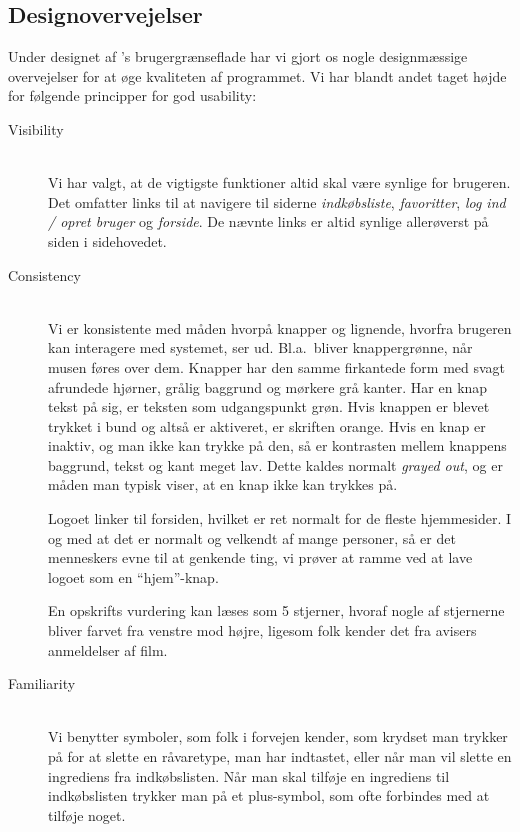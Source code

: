 \subsection{Designovervejelser}
\label{subsec:designovervejelser}

Under designet af \Foodl{}'s brugergrænseflade har vi gjort os nogle designmæssige overvejelser for at øge kvaliteten af programmet. Vi har blandt andet taget højde for følgende principper for god usability\cite[s.~90]{deb}:

\begin{description}
\item[Visibility] \hfill \\
Vi har valgt, at de vigtigste funktioner altid skal være synlige for brugeren. Det omfatter links til at navigere til siderne \textit{indkøbsliste}, \textit{favoritter}, \textit{log ind / opret bruger} og \textit{forside}. De nævnte links er altid synlige allerøverst på siden i sidehovedet.
 
\item[Consistency] \hfill \\
Vi er konsistente med måden hvorpå knapper og lignende, hvorfra brugeren kan interagere med systemet, ser ud. Bl.a.\ bliver knappergrønne, når musen føres over dem. Knapper har den samme firkantede form med svagt afrundede hjørner, grålig baggrund og mørkere grå kanter. Har en knap tekst på sig, er teksten som udgangspunkt grøn. Hvis knappen er blevet trykket i bund og altså er aktiveret, er skriften orange. Hvis en knap er inaktiv, og man ikke kan trykke på den, så er kontrasten mellem knappens baggrund, tekst og kant meget lav. Dette kaldes normalt \textit{grayed out}, og er måden man typisk viser, at en knap ikke kan trykkes på.

Logoet linker til forsiden, hvilket er ret normalt for de fleste hjemmesider. I og med at det er normalt og velkendt af mange personer, så er det menneskers evne til at genkende ting, vi prøver at ramme ved at lave logoet som en ``hjem''-knap.

En opskrifts vurdering kan læses som 5 stjerner, hvoraf nogle af stjernerne bliver farvet fra venstre mod højre, ligesom folk kender det fra \fx avisers anmeldelser af film.

\item[Familiarity] \hfill \\
Vi benytter symboler, som folk i forvejen kender, som \fx krydset man trykker på for at slette en råvaretype, man har indtastet, eller når man vil slette en ingrediens fra indkøbslisten. Når man skal tilføje en ingrediens til indkøbslisten trykker man på et plus-symbol, som ofte forbindes med at tilføje noget.


\end{description}
